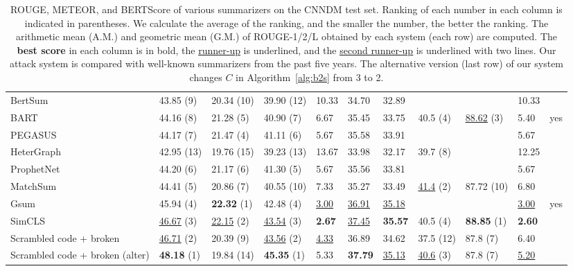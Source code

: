 \documentclass[11pt]{article}
\theoremstyle{remark}
\begin{document}
\begin{landscape}
\begin{table}[t]
\begin{tabularx}{\linewidth}{Xllllllllll}
BertSum                        ~\citealp{liu-lapata-2019-text} & 43.85 (9) & 20.34 (10) & 39.90 (12) & 10.33 & 34.70 & 32.89 &          &           & 10.33 &     \\
BART                           ~\citealp{lewis-etal-2020-bart} & 44.16 (8) & 21.28 (5) & 40.90 (7) & 6.67  & 35.45 & 33.75 & 40.5 (4) & \underline{\underline{88.62}} (3) & 5.40  & yes \\
PEGASUS                        ~\citealp{zhang2020pegasus} & 44.17 (7) & 21.47 (4) & 41.11 (6) & 5.67  & 35.58 & 33.91 &          &           & 5.67  &     \\
HeterGraph                     ~\citealp{wang-etal-2020-heterogeneous} & 42.95 (13) & 19.76 (15) & 39.23 (13) & 13.67 & 33.98 & 32.17 & 39.7 (8) &           & 12.25 &     \\
ProphetNet                     ~\citealp{qi-etal-2020-prophetnet} & 44.20 (6) & 21.17 (6) & 41.30 (5) & 5.67  & 35.56 & 33.81 &          &           & 5.67  &     \\
MatchSum                       ~\citealp{zhong-etal-2020-extractive} & 44.41 (5) & 20.86 (7) & 40.55 (10) & 7.33  & 35.27 & 33.49 & \underline{41.4} (2) & 87.72 (10) & 6.80  &     \\
Gsum                           ~\citealp{dou-etal-2021-gsum} & 45.94 (4) & \textbf{22.32} (1) & 42.48 (4) & \underline{3.00}  & \underline{\underline{36.91}} & \underline{35.18} &          &           & \underline{3.00}  & yes \\
SimCLS                         ~\citealp{liu-liu-2021-simcls} & \underline{\underline{46.67}} (3) & \underline{22.15} (2) & \underline{\underline{43.54}} (3) & \textbf{2.67}  & \underline{37.45} & \textbf{35.57} & 40.5 (4) & \textbf{88.85} (1) & \textbf{2.60}  &     \\
\hline
Scrambled code + broken                        & \underline{46.71} (2) & 20.39 (9) & \underline{43.56} (2) & \underline{\underline{4.33}}  & 36.89 & 34.62 & 37.5 (12) & 87.8  (7) & 6.40  &     \\
Scrambled code + broken (alter)                     & \textbf{48.18} (1) & 19.84 (14) & \textbf{45.35} (1) & 5.33  & \textbf{37.79} & \underline{\underline{35.13}} & \underline{\underline{40.6}} (3) & 87.8  (7) & \underline{\underline{5.20}}  &    
           \\
\hline
\end{tabularx}
\caption{ROUGE, METEOR, and BERTScore of various summarizers on the CNNDM test set. Ranking of each number in each column is indicated in parentheses. We calculate the average of the ranking, and the smaller the number, the better the ranking. The arithmetic mean (A.M.) and geometric mean (G.M.) of ROUGE-1/2/L obtained by each system (each row) are computed. The \textbf{best score} in each column is in bold, the \underline{runner-up} is underlined, and the \underline{\underline{second runner-up}} is underlined with two lines. Our attack system is compared with well-known summarizers from the past five years. The alternative version (last row) of our system changes $C$ in Algorithm~\ref{alg:b2s} from 3 to 2.}
\label{tab:additional}
\end{table}
\end{landscape}
 
\end{document}
